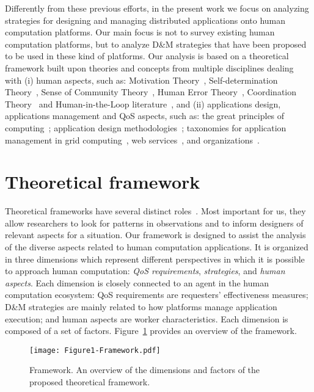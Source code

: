 \documentclass[11pt]{bmc_article_s50}
\begin{document}
Differently from these previous efforts, in the present work we focus on analyzing strategies for designing and managing distributed applications onto human computation platforms. Our main focus is not to survey existing human computation platforms, but to analyze D\&M strategies that have been proposed to be  used in these kind of platforms. Our analysis is based on a theoretical framework built upon theories and concepts from multiple disciplines dealing with (i) human aspects, such as: Motivation Theory~\cite{Maslow:1943}, Self-determination Theory~\cite{Deci:book:1985}, Sense of Community Theory~\cite{mcmillan:JCP:1996}, Human Error Theory~\cite{James:HumanError:1990}, Coordination Theory~\cite{Malone1994} and Human-in-the-Loop literature~\cite{Cranor:UPSEC:2008}, and (ii) applications design, applications management and QoS aspects, such as: the great principles of computing~\cite{Denning2003}; application design methodologies~\cite{Georgakopoulos:1995,Kiepuszewski:2000}; taxonomies for application management in grid computing~\cite{Yu:2005}, web services~\cite{Cardoso:2002}, and organizations~\cite{Kumar:2002}.

\section{Theoretical framework}
\label{sec:arc}

Theoretical frameworks have several distinct roles~\cite{Grudin:2012}. Most important for us, they allow researchers to look for patterns in observations and to inform designers of relevant aspects for a situation. Our framework is designed to assist the analysis of the diverse aspects related to human computation applications. It is organized in three dimensions which represent different perspectives in which it is possible to approach human computation: \textit{QoS requirements},  \textit{strategies}, and \textit{human aspects}. Each dimension is closely connected to an agent in the human computation ecosystem: QoS requirements are requesters' effectiveness measures; D\&M strategies are mainly related to how platforms manage application execution; and human aspects are worker characteristics. Each dimension is composed of a set of factors. Figure~\ref{fig1} provides an overview of the framework.

\begin{figure}[!h]
\centering
\texttt{[image: Figure1-Framework.pdf]}
\caption{Framework.
An overview of the dimensions and factors of the proposed theoretical framework.}
\label{fig1}
\end{figure}
\end{document}
